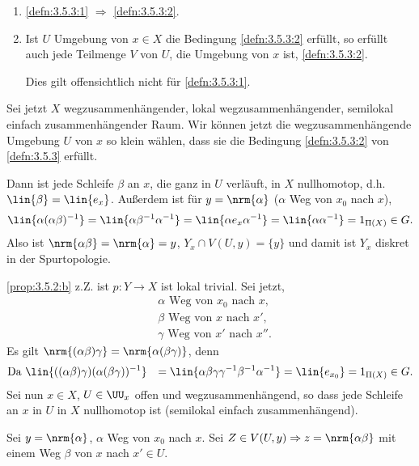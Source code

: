 \begin{bemn}[Bemerkungen]
\begin{enumerate}[label=\arabic{*}.)]
  \item \ref{defn:3.5.3:1} $\Rightarrow$ \ref{defn:3.5.3:2}.
  \item Ist $U$ Umgebung von $x\in X$ die Bedingung \ref{defn:3.5.3:2} erfüllt,
  so erfüllt auch jede Teilmenge $V$ von $U$, die Umgebung von $x$ ist,
  \ref{defn:3.5.3:2}.
  
  Dies gilt offensichtlich nicht für \ref{defn:3.5.3:1}.
\end{enumerate}
\end{bemn}

  Sei jetzt $X$ wegzusammenhängender, lokal wegzusammenhängender, semilokal
  einfach zusammenhängender Raum.   Wir können jetzt die wegzusammenhängende Umgebung $U$ von $x$ so
  klein wählen, dass sie die Bedingung \ref{defn:3.5.3:2} von \ref{defn:3.5.3}
  erfüllt.
  
  Dann ist jede Schleife $\beta$ an $x$, die ganz in $U$ verläuft, in $X$
  nullhomotop, d.h. $\lin{\beta} =\lin{e_{x}}$. Außerdem ist für $y =
  \nrm{\alpha}$ ($\alpha$ Weg von $x_0$ nach $x$),
\begin{align*}
\lin{\alpha(\alpha\beta)^{-1}} = \lin{\alpha\beta^{-1}\alpha^{-1}} =
\lin{\alpha e_{x} \alpha^{-1}} = \lin{\alpha\alpha^{-1}} = 1_{\Pi(X)} \in G.
\end{align*}
Also ist $\nrm{\alpha\beta} = \nrm{\alpha} = y$, $Y_x\cap V(U,y)=\{y\}$ und
damit ist $Y_x$ diskret in der Spurtopologie.

\ref{prop:3.5.2:b} z.Z. ist $p: Y\to X$ ist lokal trivial. Sei jetzt,
\begin{align*}
&\alpha \text{ Weg von $x_0$ nach $x$},\\
&\beta  \text{ Weg von $x$ nach $x'$},\\
&\gamma  \text{ Weg von $x'$ nach $x''$}.
\end{align*}
Es gilt $\nrm{(\alpha\beta)\gamma}=\nrm{\alpha(\beta\gamma)}$, denn
\begin{align*}
\text{Da } & \lin{((\alpha\beta)\gamma)(\alpha(\beta\gamma))^{-1}}
&= \lin{\alpha\beta\gamma\gamma^{-1}\beta^{-1}\alpha^{-1}} = \lin{e_{x_0}} =
1_{\Pi(X)}\in G.
\end{align*}
Sei nun $x\in X$, $U\in \UU_x$ offen und wegzusammenhängend, so dass jede
Schleife an $x$ in $U$ in $X$ nullhomotop ist (semilokal einfach
zusammenhängend).

Sei $y=\nrm{\alpha}$, $\alpha$ Weg von $x_0$ nach $x$. Sei $Z\in
V(U,y)\Rightarrow z=\nrm{\alpha\beta}$ mit einem Weg $\beta$ von $x$ nach
$x'\in U$.

